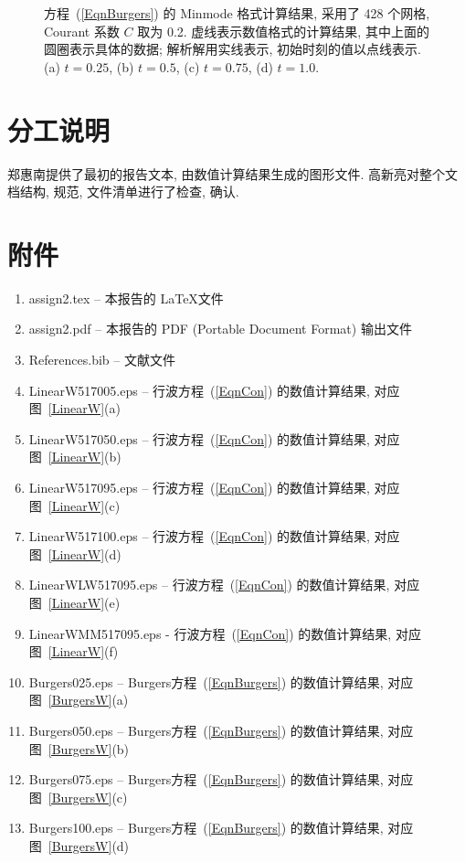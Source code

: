 \documentclass[10.5pt
]{article}
\begin{document}
\begin{figure}
\begin{subfigure}{.9\linewidth}
  \label{fig:problem2-4}
\end{subfigure}
\caption{%
  方程~(\ref{EqnBurgers}) 的 Minmode 格式计算结果, 采用了 428 个网格, Courant 系数 $C$ 取为 0.2. 虚线表示数值格式的计算结果, 其中上面的圆圈表示具体的数据;
  解析解用实线表示, 初始时刻的值以点线表示. (a) $t=0.25$, (b) $t=0.5$, (c) $t=0.75$, (d) $t=1.0$.
}
  \label{fig:problem2-summary}%
\end{figure}

\section{分工说明}

郑惠南提供了最初的报告文本, 由数值计算结果生成的图形文件. 高新亮对整个文档结构, 规范, 文件清单进行了检查, 确认.

\section{附件}

\begin{enumerate}
\item
assign2.tex -- 本报告的 \LaTeX 文件
\item
assign2.pdf -- 本报告的 PDF (Portable Document Format) 输出文件
\item
References.bib -- 文献文件
\item
LinearW517005.eps -- 行波方程~(\ref{EqnCon}) 的数值计算结果, 对应图~\ref{LinearW}(a)
\item
LinearW517050.eps -- 行波方程~(\ref{EqnCon}) 的数值计算结果, 对应图~\ref{LinearW}(b)
\item
LinearW517095.eps -- 行波方程~(\ref{EqnCon}) 的数值计算结果, 对应图~\ref{LinearW}(c)
\item
LinearW517100.eps -- 行波方程~(\ref{EqnCon}) 的数值计算结果, 对应图~\ref{LinearW}(d)
\item
LinearWLW517095.eps -- 行波方程~(\ref{EqnCon}) 的数值计算结果, 对应图~\ref{LinearW}(e)
\item
LinearWMM517095.eps - 行波方程~(\ref{EqnCon}) 的数值计算结果, 对应图~\ref{LinearW}(f)
\item
Burgers025.eps -- Burgers方程~(\ref{EqnBurgers}) 的数值计算结果, 对应图~\ref{BurgersW}(a)
\item
Burgers050.eps -- Burgers方程~(\ref{EqnBurgers}) 的数值计算结果, 对应图~\ref{BurgersW}(b)
\item
Burgers075.eps -- Burgers方程~(\ref{EqnBurgers}) 的数值计算结果, 对应图~\ref{BurgersW}(c)
\item
Burgers100.eps -- Burgers方程~(\ref{EqnBurgers}) 的数值计算结果, 对应图~\ref{BurgersW}(d)
\end{enumerate}
\end{document}
